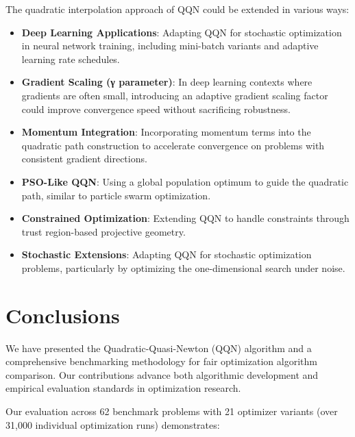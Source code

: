 The quadratic interpolation approach of QQN could be extended in various ways:

\begin{itemize}
\tightlist
\item
  \textbf{Deep Learning Applications}: Adapting QQN for stochastic optimization in neural network training, including mini-batch variants and adaptive learning rate schedules.
\item
  \textbf{Gradient Scaling (γ parameter)}: In deep learning contexts where gradients are often small, introducing an adaptive gradient scaling factor could improve convergence speed without sacrificing robustness.
\item
  \textbf{Momentum Integration}: Incorporating momentum terms into the quadratic path construction to accelerate convergence on problems with consistent gradient directions.
\item
  \textbf{PSO-Like QQN}: Using a global population optimum to guide the quadratic path, similar to particle swarm optimization.
\item
  \textbf{Constrained Optimization}: Extending QQN to handle constraints through trust region-based projective geometry.
\item
  \textbf{Stochastic Extensions}: Adapting QQN for stochastic optimization problems, particularly by optimizing the one-dimensional search under noise.
\end{itemize}

\hypertarget{conclusions}{%
\section{Conclusions}\label{conclusions}}

We have presented the Quadratic-Quasi-Newton (QQN) algorithm and a comprehensive benchmarking methodology for fair optimization algorithm comparison. Our contributions advance both algorithmic development and empirical evaluation standards in optimization research.

Our evaluation across 62 benchmark problems with 21 optimizer variants (over 31,000 individual optimization runs) demonstrates:

